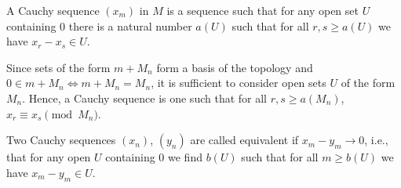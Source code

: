 A Cauchy sequence $(x_m)$ in $M$ is a sequence such that for any open
set $U$ containing $0$ there is a natural number $a(U)$ such that
for all $r, s\geq a(U)$ we have  $x_r - x_s \in U$.

Since sets of the form $m + M_n$ form a basis of the topology and
$0 \in m + M_n\iff m + M_n = M_n$, it is sufficient to consider open
sets $U$ of the form $M_n $. Hence, a Cauchy sequence is one such
that for all $r, s\geq a(M_n)$, $x_r\equiv x_s\pmod{M_n}$.

Two Cauchy sequences $(x_n)$, $(y_n)$ are called equivalent if $x_m - y_m\to 0$,
i.e., that for any open $U$ containing $0$ we find $b(U)$ such that for all
$m\geq b(U)$ we have $x_m - y_m \in U$.
